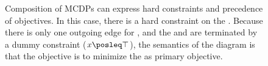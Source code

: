\begin{figure}
\begin{centering}
\par\end{centering}
\begin{centering}
\par\end{centering}
\smallskip{}

\caption{Composition of MCDPs can express hard constraints and precedence of
objectives. In this case, there is a hard constraint on the .
Because there is only one outgoing edge for , and the 
and  are terminated by a dummy constraint ($x\posleq\top$),
the semantics of the diagram is that the objective is to minimize
the  as primary objective.}
\end{figure}

